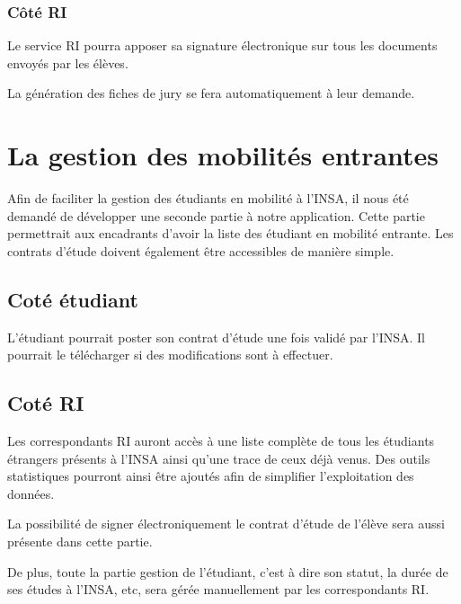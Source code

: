 		\subsubsection{Côté RI}
		
		Le service RI pourra apposer sa signature électronique sur tous les documents envoyés par les élèves.
		
		La génération des fiches de jury se fera automatiquement à leur demande.
		
		\section{La gestion des mobilités entrantes}
		
		Afin de faciliter la gestion des étudiants en mobilité à l'INSA, il nous été demandé de développer une seconde partie à notre application. Cette partie permettrait aux encadrants d'avoir la liste des étudiant en mobilité entrante. Les contrats d'étude doivent également être accessibles de manière simple.
		
		\subsection{Coté étudiant}
		L'étudiant pourrait poster son contrat d'étude une fois validé par l'INSA. Il pourrait le télécharger si des modifications sont à effectuer.
		
		\subsection{Coté RI}
		Les correspondants RI auront accès à une liste complète de tous les étudiants étrangers présents à l'INSA ainsi qu'une trace de ceux déjà venus. Des outils statistiques pourront ainsi être ajoutés afin de simplifier l'exploitation des données. 
		
		La possibilité de signer électroniquement le contrat d'étude de l'élève sera aussi présente dans cette partie.
		
		De plus, toute la partie gestion de l'étudiant, c'est à dire son statut, la durée de ses études à l'INSA, etc, sera gérée manuellement par les correspondants RI.